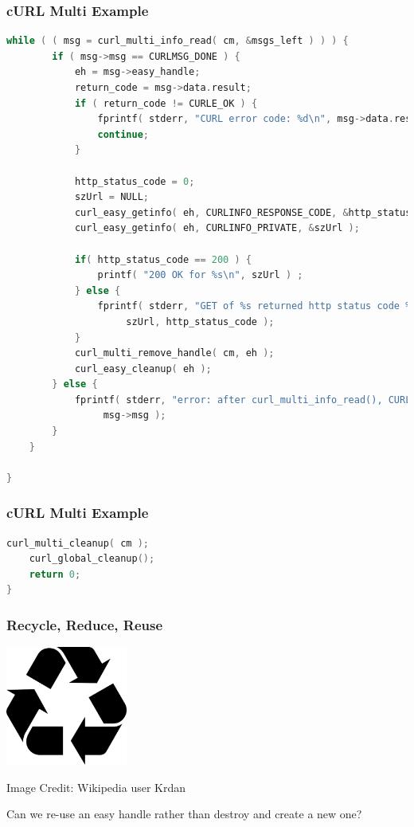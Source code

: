 \begin{frame}[fragile]
\frametitle{cURL Multi Example}

\begin{lstlisting}[language=C]
    while ( ( msg = curl_multi_info_read( cm, &msgs_left ) ) ) {
        if ( msg->msg == CURLMSG_DONE ) {
            eh = msg->easy_handle;
            return_code = msg->data.result;
            if ( return_code != CURLE_OK ) {
                fprintf( stderr, "CURL error code: %d\n", msg->data.result );
                continue;
            }

            http_status_code = 0;
            szUrl = NULL;
            curl_easy_getinfo( eh, CURLINFO_RESPONSE_CODE, &http_status_code );
            curl_easy_getinfo( eh, CURLINFO_PRIVATE, &szUrl );

            if( http_status_code == 200 ) {
                printf( "200 OK for %s\n", szUrl ) ;
            } else {
                fprintf( stderr, "GET of %s returned http status code %d\n",
                     szUrl, http_status_code );
            }
            curl_multi_remove_handle( cm, eh );
            curl_easy_cleanup( eh );
        } else {
            fprintf( stderr, "error: after curl_multi_info_read(), CURLMsg=%d\n",
                 msg->msg );
        }
    }

}
\end{lstlisting}

\end{frame}

\begin{frame}[fragile]
\frametitle{cURL Multi Example}

\begin{lstlisting}[language=C]
    curl_multi_cleanup( cm );
    curl_global_cleanup();
    return 0;
}
\end{lstlisting}

\end{frame}

\begin{frame}
\frametitle{Recycle, Reduce, Reuse}

\begin{center}
	\includegraphics[width=0.3\textwidth]{images/recycle.png}
\end{center}
\hfill Image Credit: Wikipedia user Krdan

Can we re-use an easy handle rather than destroy and create a new one?

\end{frame}

